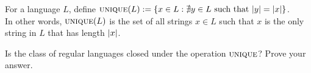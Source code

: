 \def \uniq { \textsc{unique} }
\begin{problem}
  For a language $L$, define
  $\uniq(L) := \set{x \in L : \nexists y \in L
  \text{ such that } \abs{y} = \abs{x}}$. \\
  In other words, $\uniq(L)$ is the set of all strings $x \in L$
  such that $x$ is the only string in $L$ that has length $\lvert x\rvert$.

  \step
  Is the class of regular languages closed under the operation $\uniq$?
  Prove your answer.
\end{problem}
\begin{Answer}
  
\end{Answer}
